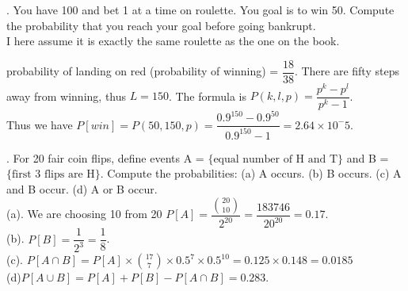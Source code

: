 \documentclass{article}
\begin{document}
\begin{addmargin}[2em]{2em}
. You have 100 and bet 1 at a time on roulette. You goal is to win 50. Compute the probability that you reach your goal before going bankrupt.\\

I here assume it is exactly the same roulette as the one on the book.

probability of landing on red (probability of winning) = $\dfrac{18}{38}$. There are fifty steps away from winning, thus $L=150$.
The formula is $P(k,l,p) = \dfrac{p^k-p^l}{p^k-1}$.\\
Thus we have $P[win] = P(50,150,p) = \dfrac{0.9^{150}-0.9^{50}}{0.9^{150}-1} = 2.64 \times 10^-5$.
\end{addmargin}
\newpage
\begin{addmargin}[2em]{2em}
	. For 20 fair coin flips, define events A = $\{\text{equal number of H and T}\}$ and B = $\{\text{first 3 flips are H}\}$.
	Compute the probabilities: (a) A occurs. (b) B occurs. (c) A and B occur. (d) A or B occur.\\
	
	(a). We are choosing 10 from 20
	$P[A] = \dfrac{\binom{20}{10}}{2^20} = \dfrac{183746}{20^20} = 0.17$.\\
	
	(b). $P[B] = \dfrac{1}{2^3} = \dfrac{1}{8}$.\\
	
	(c). $P[A \cap B] = P[A] \times  \binom{17}{7} \times 0.5^7 \times 0.5^{10} = 0.125 \times 0.148 = 0.0185$\\
	
	(d)$P[A \cup B] = P[A]+P[B]-P[A \cap B] = 0.283$.
	
\end{addmargin}
\end{document}
